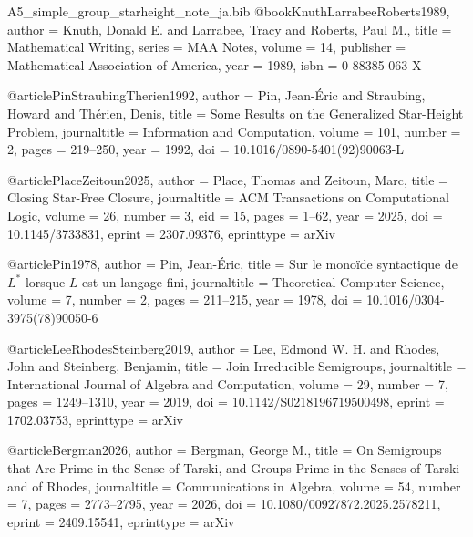 \begin{filecontents*}{A5_simple_group_starheight_note_ja.bib}
@book{KnuthLarrabeeRoberts1989,
  author    = {Knuth, Donald E. and Larrabee, Tracy and Roberts, Paul M.},
  title     = {Mathematical Writing},
  series    = {MAA Notes},
  volume    = {14},
  publisher = {Mathematical Association of America},
  year      = {1989},
  isbn      = {0-88385-063-X}
}

@article{PinStraubingTherien1992,
  author       = {Pin, Jean-{\'E}ric and Straubing, Howard and Th{\'e}rien, Denis},
  title        = {Some Results on the Generalized Star-Height Problem},
  journaltitle = {Information and Computation},
  volume       = {101},
  number       = {2},
  pages        = {219--250},
  year         = {1992},
  doi          = {10.1016/0890-5401(92)90063-L}
}

@article{PlaceZeitoun2025,
  author       = {Place, Thomas and Zeitoun, Marc},
  title        = {Closing Star-Free Closure},
  journaltitle = {ACM Transactions on Computational Logic},
  volume       = {26},
  number       = {3},
  eid          = {15},
  pages        = {1--62},
  year         = {2025},
  doi          = {10.1145/3733831},
  eprint       = {2307.09376},
  eprinttype   = {arXiv}
}

@article{Pin1978,
  author       = {Pin, Jean-{\'E}ric},
  title        = {Sur le mono{\"i}de syntactique de $L^*$ lorsque $L$ est un langage fini},
  journaltitle = {Theoretical Computer Science},
  volume       = {7},
  number       = {2},
  pages        = {211--215},
  year         = {1978},
  doi          = {10.1016/0304-3975(78)90050-6}
}

@article{LeeRhodesSteinberg2019,
  author       = {Lee, Edmond W. H. and Rhodes, John and Steinberg, Benjamin},
  title        = {Join Irreducible Semigroups},
  journaltitle = {International Journal of Algebra and Computation},
  volume       = {29},
  number       = {7},
  pages        = {1249--1310},
  year         = {2019},
  doi          = {10.1142/S0218196719500498},
  eprint       = {1702.03753},
  eprinttype   = {arXiv}
}

@article{Bergman2026,
  author       = {Bergman, George M.},
  title        = {On Semigroups that Are Prime in the Sense of Tarski, and Groups Prime in the Senses of Tarski and of Rhodes},
  journaltitle = {Communications in Algebra},
  volume       = {54},
  number       = {7},
  pages        = {2773--2795},
  year         = {2026},
  doi          = {10.1080/00927872.2025.2578211},
  eprint       = {2409.15541},
  eprinttype   = {arXiv}
}


\end{filecontents*}
